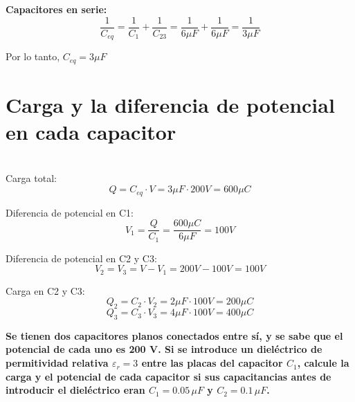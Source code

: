 \documentclass[answers]{exam} %
\begin{document}
\begin{questions}
\begin{parts}
		\textbf{Capacitores en serie:}
		\[
			\frac{1}{C_{eq}} = \frac{1}{C_1} + \frac{1}{C_{23}} = \frac{1}{6 \mu F} + \frac{1}{6 \mu F} = \frac{1}{3 \mu F}
		\]

		Por lo tanto, $C_{eq} = 3 \mu F$

		\part{Carga y la diferencia de potencial en cada capacitor}\\

		Carga total:
		\[
			Q = C_{eq} \cdot V = 3 \mu F \cdot 200 V = 600 \mu C
		\]

		Diferencia de potencial en C1:
		\[
			V_1 = \frac{Q}{C_1} = \frac{600 \mu C}{6 \mu F} = 100 V
		\]

		Diferencia de potencial en C2 y C3:
		\[
			V_2 = V_3 = V - V_1 = 200 V - 100 V = 100 V
		\]

		Carga en C2 y C3:
		\[
			Q_2 = C_2 \cdot V_2 = 2 \mu F \cdot 100 V = 200 \mu C
		\]
		\[
			Q_3 = C_3 \cdot V_3 = 4 \mu F \cdot 100 V = 400 \mu C
		\]


	\end{parts}

	\vspace{0.5cm}

	\question \textbf{Se tienen dos capacitores planos conectados entre sí, y se sabe que el potencial de cada uno es 200 V. Si se introduce un dieléctrico de permitividad relativa \(\varepsilon_r = 3\) entre las placas del capacitor \(C_1\), calcule la carga y el potencial de cada capacitor si sus capacitancias antes de introducir el dieléctrico eran \(C_1 = 0.05 \, \mu F\) y \(C_2 = 0.1 \, \mu F\).}

\end{questions}
\end{document}
